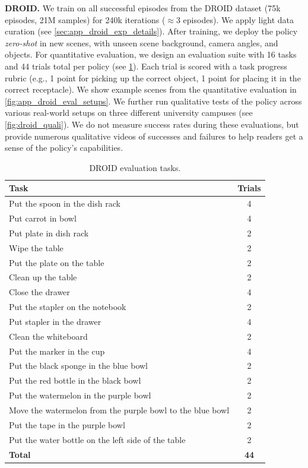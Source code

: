 \textbf{DROID.} We train on all successful episodes from the DROID dataset (75k episodes, 21M samples) for 240k iterations ($\approx$3 episodes). We apply light data curation (see \cref{sec:app_droid_exp_details}). After training, we deploy the policy \emph{zero-shot} in new scenes, with unseen scene background, camera angles, and objects. For quantitative evaluation, we design an evaluation suite with 16 tasks and 44 trials total per policy (see \cref{tab:droid_eval_tasks}). Each trial is scored with a task progress rubric (e.g., 1 point for picking up the correct object, 1 point for placing it in the correct receptacle). We show example scenes from the quantitative evaluation in \cref{fig:app_droid_eval_setups}. We further run qualitative tests of the policy across various real-world setups on three different university campuses (see \cref{fig:droid_quali}). We do not measure success rates during these evaluations, but provide numerous qualitative videos of successes and failures to help readers get a sense of the policy's capabilities.


\begin{table}[t]
    \centering
    \caption{DROID evaluation tasks.}
    \label{tab:droid_eval_tasks}
    \begin{tabular}{l|c}
        \toprule
        Task & Trials\\
        \midrule
        Put the spoon in the dish rack & 4\\
        Put carrot in bowl & 4\\
        Put plate in dish rack & 2\\
        Wipe the table & 2\\
        Put the plate on the table & 2\\
        Clean up the table & 2\\
        Close the drawer & 4\\
        Put the stapler on the notebook & 2\\
        Put stapler in the drawer & 4\\
        Clean the whiteboard & 2\\
        Put the marker in the cup & 4\\
        Put the black sponge in the blue bowl & 2\\
        Put the red bottle in the black bowl & 2\\
        Put the watermelon in the purple bowl & 2\\
        Move the watermelon from the purple bowl to the blue bowl & 2\\
        Put the tape in the purple bowl & 2\\
        Put the water bottle on the left side of the table & 2\\
        \midrule
        \textbf{Total} & \textbf{44}\\
        \bottomrule
    \end{tabular}
\end{table}


